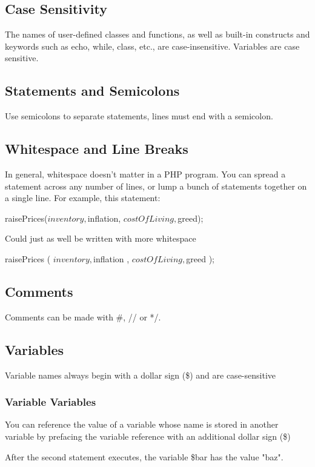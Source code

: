 \documentclass{report}
\begin{document}
    \pagebreak 
    \bigbreak \noindent 
    \subsection{Case Sensitivity}
    \bigbreak \noindent 
    The names of user-defined classes and functions, as well as built-in constructs and keywords such as echo, while, class, etc., are case-insensitive.
    \bigbreak \noindent 
    Variables are case sensitive.
    \bigbreak \noindent 
    \subsection{Statements and Semicolons}
    \bigbreak \noindent 
    Use semicolons to separate statements, lines must end with a semicolon.
    \bigbreak \noindent 
    \subsection{Whitespace and Line Breaks}
    \bigbreak \noindent 
    In general, whitespace doesn’t matter in a PHP program. You can spread a statement across any number of lines, or lump a bunch of statements together on a single line. For example, this statement:
    \bigbreak \noindent 
    \begin{phpcode}
    raisePrices($inventory, $inflation, $costOfLiving, $greed);
    \end{phpcode}
    \bigbreak \noindent 
    Could just as well be written with more whitespace
    \bigbreak \noindent 
    \begin{phpcode}
        raisePrices (
            $inventory ,
            $inflation ,
            $costOfLiving ,
            $greed
        );
    \end{phpcode}
    \bigbreak \noindent 
    \subsection{Comments}
    \bigbreak \noindent 
    Comments can be made with \#, // or \* */.

    \pagebreak 
    \subsection{Variables}
    \bigbreak \noindent 
    Variable names always begin with a dollar sign (\$) and are case-sensitive

    \bigbreak \noindent 
    \subsubsection{Variable Variables}
    \bigbreak \noindent 
    You can reference the value of a variable whose name is stored in another variable by prefacing the variable reference with an additional dollar sign (\$)
    \bigbreak \noindent 
    After the second statement executes, the variable \$bar has the value "baz".
\end{document}

